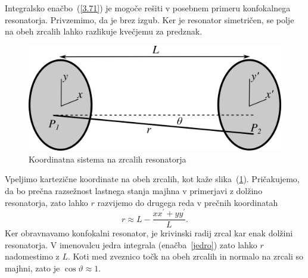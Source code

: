 Integralsko enačbo~(\ref{3.71}) je mogoče rešiti v posebnem primeru
konfokalnega resonatorja. Privzemimo, da je brez izgub. 
Ker je resonator simetričen, se polje na obeh zrcalih lahko razlikuje kvečjemu
za predznak.
\begin{figure}[h]
\centering
\includegraphics[width=7truecm]{slike/04_Uklon.png}
\caption{Koordinatna sistema na zrcalih resonatorja}
\label{fig:uklon_res_shema}
\end{figure}

Vpeljimo kartezične koordinate na obeh zrcalih, kot kaže slika~(\ref{fig:uklon_res_shema}).
Pričakujemo, da bo prečna razsežnost lastnega stanja majhna v primerjavi
z dolžino resonatorja, zato lahko $r$ razvijemo do drugega reda v
prečnih koordinatah
\begin{equation}
r\approx L-\frac{xx^{\prime}+yy^{\prime}}{L}.
\label{3.72}
\end{equation}
Ker obravnavamo konfokalni resonator, je krivinski radij zrcal kar enak dolžini resonatorja.
V imenovalcu jedra integrala (enačba~\ref{jedro}) zato lahko $r$ nadomestimo
z $L$. Koti med zveznico točk na obeh zrcalih in normalo na zrcali
so majhni, zato je  $\cos\vartheta \approx 1$. 

